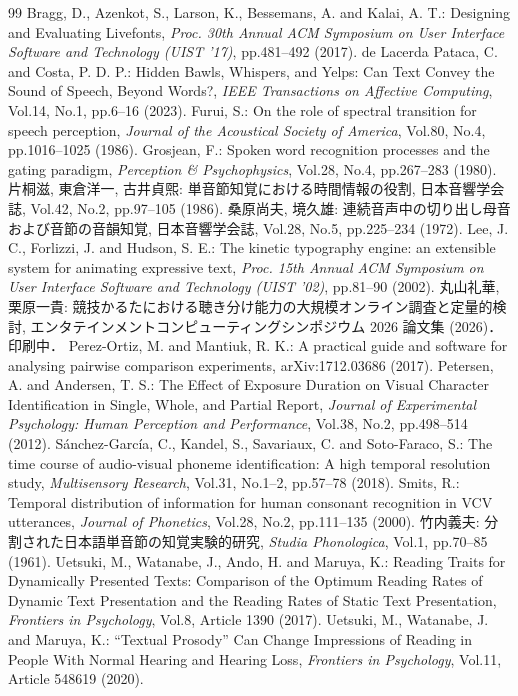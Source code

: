 \begin{thebibliography}{99}
 Bragg, D., Azenkot, S., Larson, K., Bessemans, A. and Kalai, A. T.: Designing and Evaluating Livefonts, \textit{Proc. 30th Annual ACM Symposium on User Interface Software and Technology (UIST '17)}, pp.481--492 (2017).
 de Lacerda Pataca, C. and Costa, P. D. P.: Hidden Bawls, Whispers, and Yelps: Can Text Convey the Sound of Speech, Beyond Words?, \textit{IEEE Transactions on Affective Computing}, Vol.14, No.1, pp.6--16 (2023).
 Furui, S.: On the role of spectral transition for speech perception, \textit{Journal of the Acoustical Society of America}, Vol.80, No.4, pp.1016--1025 (1986).
 Grosjean, F.: Spoken word recognition processes and the gating paradigm, \textit{Perception \& Psychophysics}, Vol.28, No.4, pp.267--283 (1980).
 片桐滋, 東倉洋一, 古井貞煕: 単音節知覚における時間情報の役割, 日本音響学会誌, Vol.42, No.2, pp.97--105 (1986).
 桑原尚夫, 境久雄: 連続音声中の切り出し母音および音節の音韻知覚, 日本音響学会誌, Vol.28, No.5, pp.225--234 (1972).
 Lee, J. C., Forlizzi, J. and Hudson, S. E.: The kinetic typography engine: an extensible system for animating expressive text, \textit{Proc. 15th Annual ACM Symposium on User Interface Software and Technology (UIST '02)}, pp.81--90 (2002).
 丸山礼華, 栗原一貴: 競技かるたにおける聴き分け能力の大規模オンライン調査と定量的検討, エンタテインメントコンピューティングシンポジウム 2026 論文集 (2026)．印刷中．
 Perez-Ortiz, M. and Mantiuk, R. K.: A practical guide and software for analysing pairwise comparison experiments, arXiv:1712.03686 (2017).
 Petersen, A. and Andersen, T. S.: The Effect of Exposure Duration on Visual Character Identification in Single, Whole, and Partial Report, \textit{Journal of Experimental Psychology: Human Perception and Performance}, Vol.38, No.2, pp.498--514 (2012).
 S\'{a}nchez-Garc\'{i}a, C., Kandel, S., Savariaux, C. and Soto-Faraco, S.: The time course of audio-visual phoneme identification: A high temporal resolution study, \textit{Multisensory Research}, Vol.31, No.1--2, pp.57--78 (2018).
 Smits, R.: Temporal distribution of information for human consonant recognition in VCV utterances, \textit{Journal of Phonetics}, Vol.28, No.2, pp.111--135 (2000).
 竹内義夫: 分割された日本語単音節の知覚実験的研究, \textit{Studia Phonologica}, Vol.1, pp.70--85 (1961).
 Uetsuki, M., Watanabe, J., Ando, H. and Maruya, K.: Reading Traits for Dynamically Presented Texts: Comparison of the Optimum Reading Rates of Dynamic Text Presentation and the Reading Rates of Static Text Presentation, \textit{Frontiers in Psychology}, Vol.8, Article 1390 (2017).
 Uetsuki, M., Watanabe, J. and Maruya, K.: ``Textual Prosody'' Can Change Impressions of Reading in People With Normal Hearing and Hearing Loss, \textit{Frontiers in Psychology}, Vol.11, Article 548619 (2020).
\end{thebibliography}
